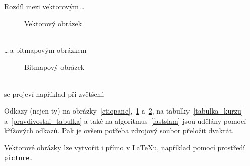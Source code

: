 \documentclass[a4paper, 11pt]{article}
\begin{document}
Rozdíl mezi vektorovým\,\dots
\begin{figure}[ht]
    \begin{center}
        \caption{Vektorový obrázek}
        \label{vektorovy_obrazek}
    \end{center}
\end{figure} \\
\dots\,a bitmapovým obrázkem
\begin{figure}[ht]
    \begin{center}
        \caption{Bitmapový obrázek}
        \label{bitmapovy_obrazek}
    \end{center}
\end{figure} \\
se projeví například při zvětšení.

Odkazy (nejen ty) na obrázky~\ref{etiopane},~\ref{vektorovy_obrazek} a~\ref{bitmapovy_obrazek}, na tabulky~\ref{tabulka_kurzu} a~\ref{pravdivostni_tabulka} a také na algoritmus~\ref{fastslam} jsou udělány pomocí křížových odkazů. Pak je ovšem potřeba zdrojový soubor přeložit dvakrát.

Vektorové obrázky lze vytvořit i přímo v \LaTeX u, například pomocí prostředí\texttt{ picture.}
\pagebreak
\end{document}

